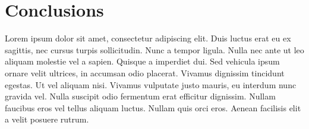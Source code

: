 \section{Conclusions}

Lorem ipsum dolor sit amet, consectetur adipiscing elit. Duis luctus erat eu ex sagittis, nec cursus turpis sollicitudin. Nunc a tempor ligula. Nulla nec ante ut leo aliquam molestie vel a sapien. Quisque a imperdiet dui. Sed vehicula ipsum ornare velit ultrices, in accumsan odio placerat. Vivamus dignissim tincidunt egestas. Ut vel aliquam nisi. Vivamus vulputate justo mauris, eu interdum nunc gravida vel. Nulla suscipit odio fermentum erat efficitur dignissim. Nullam faucibus eros vel tellus aliquam luctus. Nullam quis orci eros. Aenean facilisis elit a velit posuere rutrum. 